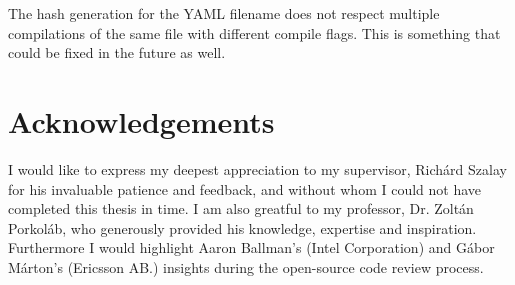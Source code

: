 The hash generation for the YAML filename does not respect multiple compilations of the same file with different compile flags. This is something
that could be fixed in the future as well.

\section*{Acknowledgements}

I would like to express my deepest appreciation to my supervisor, Richárd Szalay for his invaluable patience and feedback, and without whom
I could not have completed this thesis in time. I am also greatful to my professor, Dr. Zoltán Porkoláb, who generously provided his knowledge,
expertise and inspiration. Furthermore I would highlight Aaron Ballman's (Intel Corporation) and Gábor Márton's (Ericsson AB.) insights during
the open-source code review process.
